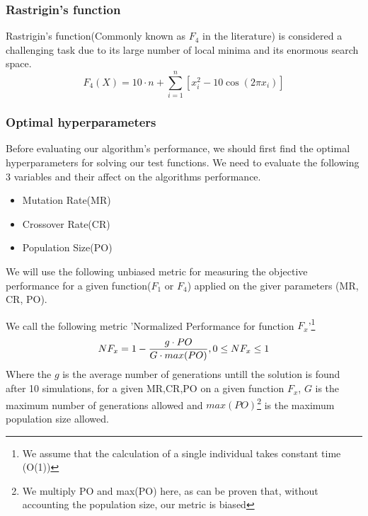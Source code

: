 \documentclass[openany]{article}
\begin{document}
			\subsubsection{Rastrigin's function}
				Rastrigin’s function(Commonly known as $F_{4}$ in the literature\cite{performance}) is considered a challenging task due to its large number of local minima and its enormous search space.
				\begin{equation}
				F_4(X)=10\cdot n+\sum_{i=1}^{n}[x_{i}^{2}-10\cos(2\pi x_{i})]
				\end{equation}
			\subsubsection{Optimal hyperparameters}
				Before evaluating our algorithm's performance, we should first find the optimal hyperparameters for solving our test functions.
				We need to evaluate the following 3 variables and their affect on the algorithms performance.
				\begin{itemize}
					\item Mutation Rate(MR)
					\item Crossover Rate(CR)
					\item Population Size(PO)
				\end{itemize}
				We will use the following unbiased metric for measuring the objective performance for a given function($F_1$ or $F_4$) applied on the giver parameters (MR, CR, PO).
				\pagebreak
				\begin{definition}
					We call the following metric 'Normalized Performance for function $F_{x}$'\footnote{We assume that the calculation of a single individual takes constant time (O(1))}
					\begin{equation}
						NF_{x}=1-\frac{g\cdot PO}{G\cdot max(PO)},\space 0\le NF_{x}\le 1
					\end{equation}
					Where the $g$ is the average number of generations untill the solution is found after 10 simulations, for a given MR,CR,PO on a given function $F_{x}$, $G$ is
					the maximum number of generations allowed and $max(PO)$\footnote{We multiply PO and max(PO) here, as can be proven that, without accounting the population size, our metric is biased} is the maximum population size allowed.
				\end{definition}
\end{document}
